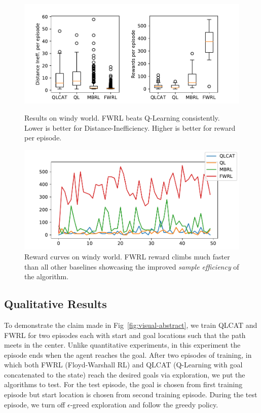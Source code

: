 \begin{figure}
    \begin{minipage}{\columnwidth}
        \includegraphics[width=\columnwidth]{./media/metrics-windy-world.pdf}
        \caption{Results on windy world. FWRL beats Q-Learning
        consistently. Lower is better for Distance-Inefficiency. Higher
        is better for reward per episode. }
      \label{fig:ql-fw-windy-world-results}%
    \end{minipage}
    \begin{minipage}{\columnwidth}
        \includegraphics[width=\columnwidth]{./media/rewards-metrics-windy-world.pdf}
        \caption{Reward curves on windy world. FWRL reward climbs much
        faster than all other baselines showcasing the improved \emph{sample
        efficiency} of the algorithm.}
    \label{fig:ql-fw-windy-world-reward-curves}%
    \end{minipage}
\end{figure}


\subsection{Qualitative Results}

To demonstrate the claim made in Fig~\ref{fig:visual-abstract}, we train QLCAT
and FWRL for two episodes each with start and goal locations such that the path
meets in the center. Unlike quantitative experiments, in this experiment the
episode ends when the agent reaches the goal.
After two episodes of training, in which both FWRL (Floyd-Warshall RL) and QLCAT
(Q-Learning with goal concatenated to the state) reach the desired
goals via exploration, we put the algorithms to test.
For the test episode, the goal is chosen from first training episode but start
location is chosen from second training episode.
During the test episode,
we turn off $\epsilon$-greed exploration and follow the greedy policy.

